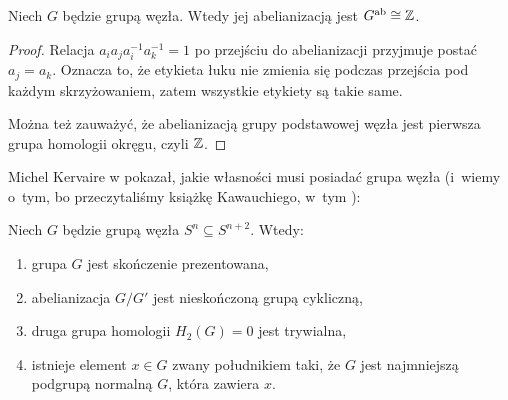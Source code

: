 \begin{comment}
\begin{figure}[H]
    \begin{minipage}[b]{.48\linewidth}
        \[
            \HugeWirtingerPlus
        \]
        \subcaption{skrzyżowanie dodatnie: $x_j = x_k x_{j+1} x_k^{-1}$}
    \end{minipage}
    \begin{minipage}[b]{.48\linewidth}
        \[
            \HugeWirtingerMinus
        \]
        \subcaption{skrzyżowanie ujemne: $x_j = x_k^{-1} x_{j+1} x_k$}
    \end{minipage}
\end{figure}
\end{comment}

\begin{corollary}
    Niech $G$ będzie grupą węzła.
    Wtedy jej abelianizacją jest $G^{\operatorname{ab}} \cong \mathbb Z$.
\end{corollary}

\begin{proof}
    Relacja $a_ia_ja_i^{-1}a_k^{-1}=1$ po przejściu do abelianizacji przyjmuje postać $a_j = a_k$.
    Oznacza to, że etykieta łuku nie zmienia się podczas przejścia pod każdym skrzyżowaniem, zatem wszystkie etykiety są takie same.

    Można też zauważyć, że abelianizacją grupy podstawowej węzła jest pierwsza grupa homologii okręgu, czyli $\mathbb Z$.
\end{proof}

Michel Kervaire w \cite{kervaire1965} pokazał, jakie własności musi posiadać grupa węzła (i~wiemy o~tym, bo przeczytaliśmy książkę Kawauchiego, w~tym \cite[tw. 14.1.1]{kawauchi1996}):
%

\begin{proposition}
%
%
    Niech $G$ będzie grupą węzła $S^n \subseteq S^{n+2}$.
    Wtedy:
    \begin{enumerate}
        \item grupa $G$ jest skończenie prezentowana,
        \item abelianizacja $G/G'$ jest nieskończoną grupą cykliczną,
        \item druga grupa homologii $H_2(G) = 0$ jest trywialna,
        \item istnieje element $x \in G$ zwany południkiem taki, że $G$ jest najmniejszą podgrupą normalną $G$, która zawiera $x$.
    \end{enumerate}
\end{proposition}

